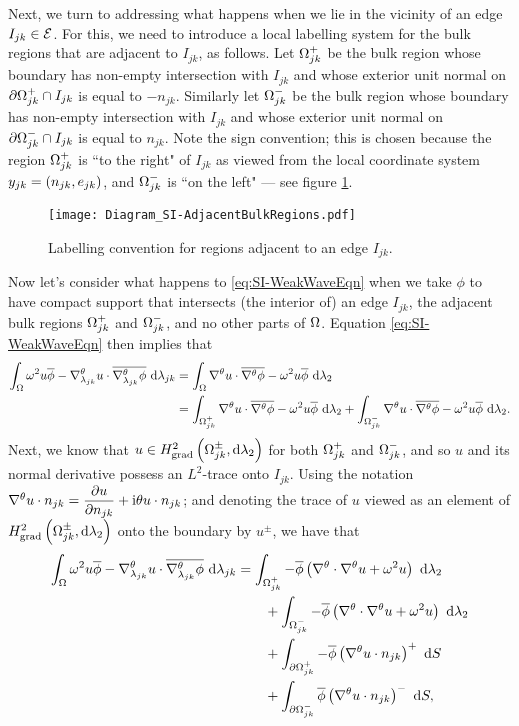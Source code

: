 Next, we turn to addressing what happens when we lie in the vicinity of an edge $I_{jk}\in\mathcal{E}$.
For this, we need to introduce a local labelling system for the bulk regions that are adjacent to $I_{jk}$, as follows.
Let $\Omega_{jk}^+$ be the bulk region whose boundary has non-empty intersection with $I_{jk}$ and whose exterior unit normal on $\partial\Omega_{jk}^+\cap I_{jk}$ is equal to $-n_{jk}$.
Similarly let $\Omega_{jk}^-$ be the bulk region whose boundary has non-empty intersection with $I_{jk}$ and whose exterior unit normal on $\partial\Omega_{jk}^-\cap I_{jk}$ is equal to $n_{jk}$.
Note the sign convention; this is chosen because the region $\Omega_{jk}^+$ is ``to the right" of $I_{jk}$ as viewed from the local coordinate system $y_{jk}=\left( n_{jk}, e_{jk} \right)$, and $\Omega_{jk}^-$ is ``on the left" --- see figure \ref{fig:Diagram_SI-AdjacentBulkRegions}.
\begin{figure}[h]
	\centering
	\texttt{[image: Diagram\_SI-AdjacentBulkRegions.pdf]}
	\caption{\label{fig:Diagram_SI-AdjacentBulkRegions} Labelling convention for regions adjacent to an edge $I_{jk}$.}
\end{figure}
Now let's consider what happens to \eqref{eq:SI-WeakWaveEqn} when we take $\phi$ to have compact support that intersects (the interior of) an edge $I_{jk}$, the adjacent bulk regions $\Omega_{jk}^+$ and $\Omega_{jk}^-$, and no other parts of $\Omega$.
Equation \eqref{eq:SI-WeakWaveEqn} then implies that
\begin{align*}
	\int_{\Omega} \omega^2 u\overline{\phi} - \nabla^{\theta}_{\lambda_{jk}}u\cdot\overline{\nabla^{\theta}_{\lambda_{jk}}\phi}  \ \mathrm{d}\lambda_{jk}
	&= \int_{\Omega} \nabla^{\theta} u\cdot\overline{\nabla^{\theta}\phi} - \omega^2 u\overline{\phi}  \ \mathrm{d}\lambda_2 \\
	&= \int_{\Omega_{jk}^+} \nabla^{\theta} u\cdot\overline{\nabla^{\theta}\phi} - \omega^2 u\overline{\phi}  \ \mathrm{d}\lambda_2
	+ \int_{\Omega_{jk}^-} \nabla^{\theta} u\cdot\overline{\nabla^{\theta}\phi} - \omega^2 u\overline{\phi}  \ \mathrm{d}\lambda_2.
\end{align*}
Next, we know that $u\in H^2_\mathrm{grad}\left( \Omega_{jk}^{\pm}, \mathrm{d}\lambda_2 \right)$ for both $\Omega_{jk}^+$ and $\Omega_{jk}^-$, and so $u$ and its normal derivative possess an $L^2$-trace onto $I_{jk}$.
Using the notation $\nabla^{\theta} u\cdot n_{jk} = \dfrac{\partial u}{\partial n_{jk}} + \mathrm{i}\theta u\cdot n_{jk}$; and denoting the trace of $u$ viewed as an element of $H^2_\mathrm{grad}\left( \Omega_{jk}^{\pm}, \mathrm{d}\lambda_2 \right)$ onto the boundary by $u^{\pm}$, we have that
\begin{align*}
	\int_{\Omega} \omega^2 u\overline{\phi} - \nabla^{\theta}_{\lambda_{jk}}u\cdot\overline{\nabla^{\theta}_{\lambda_{jk}}\phi}  \ \mathrm{d}\lambda_{jk}
	&= \int_{\Omega_{jk}^+} -\overline{\phi}\left(  \nabla^{\theta}\cdot\nabla^{\theta} u + \omega^2 u  \right)  \ \mathrm{d}\lambda_2 \\
	&\qquad + \int_{\Omega_{jk}^-} -\overline{\phi}\left(  \nabla^{\theta}\cdot\nabla^{\theta} u + \omega^2 u  \right)  \ \mathrm{d}\lambda_2 \\
	&\qquad + \int_{\partial\Omega_{jk}^+} -\overline{\phi}\left( \nabla^{\theta} u\cdot n_{jk} \right)^{+}  \ \mathrm{d}S \\
	&\qquad + \int_{\partial\Omega_{jk}^-} \overline{\phi}\left( \nabla^{\theta} u\cdot n_{jk} \right)^{-}  \ \mathrm{d}S,
\end{align*}
